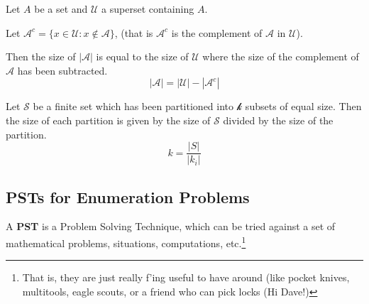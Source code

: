 
\begin{tcolorbox}[title={The Subtraction Principle}, colback={white},colframe={black},colbacktitle={white},coltitle={black},fonttitle=\bfseries,subtitle style={boxrule=0.4pt,colback=white}]

Let $A$ be a set and $\mathcal{U}$ a superset containing $A$. 

Let $\mathcal{A}^{c} = \{ x\in \mathcal{U} : x \not\in \mathcal{A}\}$, (that is $\mathcal{A}^{c}$ is the complement of $\mathcal{A}$ in $\mathcal{U}$). 

Then the size of $|\mathcal{A}|$ is equal to the size of $\mathcal{U}$ where the size of the complement of $\mathcal{A}$ has been subtracted. 
\[|\mathcal{A}| = |\mathcal{U}| - |\mathcal{A}^{c}|\]
\end{tcolorbox}



\begin{tcolorbox}[title={Division Principle}, colback={white},colframe={black},colbacktitle={white},coltitle={black},fonttitle=\bfseries,subtitle style={boxrule=0.4pt,colback=white}]
		
Let $\mathcal{S}$ be a finite set which has been partitioned into $\mathcal{k}$ subsets of equal size. Then the size of each partition is given by the size of $\mathcal{S}$ divided by the size of the partition.  \[k = \frac{|S|}{|k_{i}|}\]
\end{tcolorbox}


\subsection{PSTs for Enumeration Problems}

A \textbf{PST} is a Problem Solving Technique, which can be tried against a set of mathematical problems, situations, computations, etc.\footnote{That is, they are just really f'ing useful to have around (like pocket knives, multitools, eagle scouts, or a friend who can pick locks (Hi Dave!)}
\medskip


